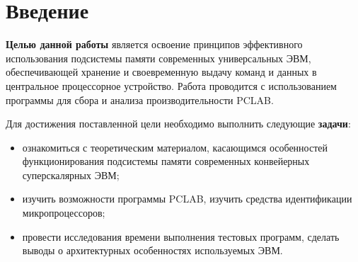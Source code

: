 \chapter*{Введение}

\textbf{Целью данной работы} является освоение принципов эффективного
использования подсистемы памяти современных универсальных ЭВМ, обеспечивающей
хранение и своевременную выдачу команд и данных в центральное процессорное
устройство. Работа проводится с использованием программы для сбора и анализа
производительности PCLAB.

Для достижения поставленной цели необходимо выполнить следующие
\textbf{задачи}:
\begin{itemize}[left=\parindent]
    \item ознакомиться с теоретическим материалом, касающимся особенностей
          функционирования подсистемы памяти современных конвейерных
          суперскалярных ЭВМ;
    \item изучить возможности программы PCLAB, изучить средства идентификации
          микропроцессоров;
    \item провести исследования времени выполнения тестовых программ, сделать
          выводы о архитектурных особенностях используемых ЭВМ.
\end{itemize}
